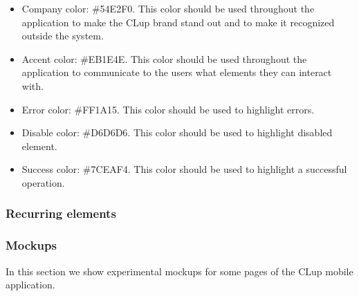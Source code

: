 \begin{itemize}[topsep=0pt]
    \item Company color: \#54E2F0. This color should be used throughout the application to make the CLup brand stand out and to make it recognized outside the system.
    \item Accent color: \#EB1E4E. This color should be used throughout the application to communicate to the users what elements they can interact with.
    \item Error color: \#FF1A15. This color should be used to highlight errors.
    \item Disable color: \#D6D6D6. This color should be used to highlight disabled element.
    \item Success color: \#7CEAF4. This color should be used to highlight a successful operation.
\end{itemize}

\subsubsection{Recurring elements}
\label{subsubsect:recurringelements}



\subsubsection{Mockups}
\label{subsubsect:mockups}

In this section we show experimental mockups for some pages of the CLup mobile application.

